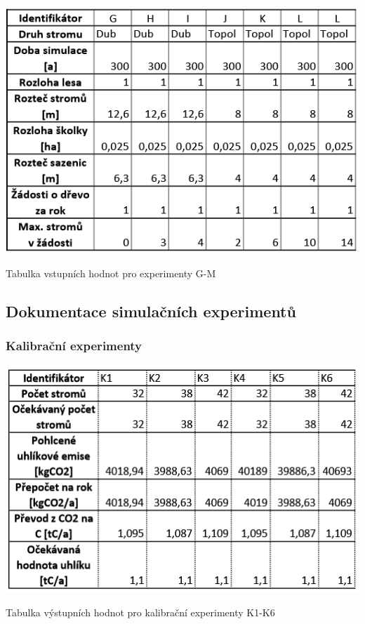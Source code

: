 \documentclass[a4paper, 11pt, titlepage]{article}
\begin{document}
\begin{table}[htb!]
    \centering
    \includegraphics[scale=1]{assets/tab_e_G_M_in.PNG}
    \caption{Tabulka vstupních hodnot pro experimenty G-M}
    \label{tab:experimenty_vstupy_2}
\end{table}

\newpage

\subsection{Dokumentace simulačních experimentů}

\subsubsection{Kalibrační experimenty}

\begin{table}[htb!]
    \centering
    \includegraphics[scale=1]{assets/tab_ke_K1_K6_out.PNG}
    \caption{Tabulka výstupních hodnot pro kalibrační experimenty K1-K6}
    \label{tab:kalibracni_experimenty_vystupy_1}
\end{table}
\end{document}
